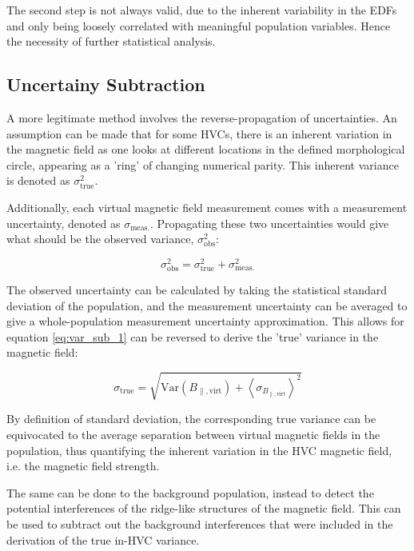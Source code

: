 The second step is not always valid, due to the inherent variability in the EDFs and only being loosely correlated with meaningful population variables. Hence the necessity of further statistical analysis.


\subsection{Uncertainy Subtraction}
\label{ssec:sigma_sub}

A more legitimate method involves the reverse-propagation of uncertainties. An assumption can be made that for some HVCs, there is an inherent variation in the magnetic field as one looks at different locations in the defined morphological circle, appearing as a 'ring' of changing numerical parity. This inherent variance is denoted as $\sigma_{\mathrm{true}}^2$.


Additionally, each virtual magnetic field measurement comes with a measurement uncertainty, denoted as $\sigma_{\mathrm{meas.}}$. Propagating these two uncertainties would give what should be the observed variance, $\sigma_{\mathrm{obs}}^2$:


\begin{equation}
    \sigma_{\mathrm{obs}}^2 = \sigma_{\mathrm{true}}^2 + \sigma_{\mathrm{meas.}}^2
\label{eq:var_sub_1}
\end{equation}


The observed uncertainty can be calculated by taking the statistical standard deviation of the population, and the measurement uncertainty can be averaged to give a whole-population measurement uncertainty approximation. This allows for equation \ref{eq:var_sub_1} can be reversed to derive the 'true' variance in the magnetic field:


\begin{equation}
    \sigma_{\mathrm{true}} = \sqrt{\mathrm{Var}\left(B_{\parallel, \mathrm{virt}}\right) + {\left<\sigma_{B_{\parallel, \mathrm{virt}}}\right>}^2}
\label{eq:var_sub_2}
\end{equation}


By definition of standard deviation, the corresponding true variance can be equivocated to the average separation between virtual magnetic fields in the population, thus quantifying the inherent variation in the HVC magnetic field, i.e. the magnetic field strength.


The same can be done to the background population, instead to detect the potential interferences of the ridge-like structures of the magnetic field. This can be used to subtract out the background interferences that were included in the derivation of the true in-HVC variance.


